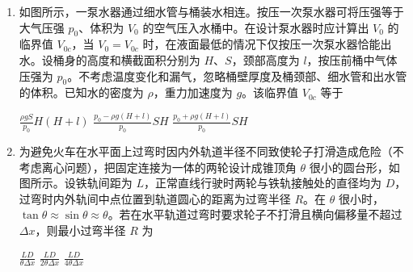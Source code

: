 \documentclass[\gkver]{gaokaozhenti}
\begin{document}
\begin{enumerate}
{故选 A。
}

\item
如图所示，一泵水器通过细水管与桶装水相连。按压一次泵水器可将压强等于大气压强 $p_{0}$、体积为 $V_{0}$ 的空气压入水桶中。在设计泵水器时应计算出 $V_{0}$ 的临界值 $V_{0c}$，当 $V_{0} = V_{0c}$ 时，在液面最低的情况下仅按压一次泵水器恰能出水。设桶身的高度和横截面积分别为 $H$、$S$，颈部高度为 $l$，按压前桶中气体压强为 $p_{0}$。不考虑温度变化和漏气，忽略桶壁厚度及桶颈部、细水管和出水管的体积。已知水的密度为 $\rho$，重力加速度为 $g$。该临界值 $V_{0c}$ 等于


{$\frac{\rho gS}{p_{0}}H(H + l)$}
{$\frac{p_{0} - \rho g(H + l)}{p_{0}}SH$}
{$\frac{p_{0} + \rho g(H + l)}{p_{0}}SH$}


\item
为避免火车在水平面上过弯时因内外轨道半径不同致使轮子打滑造成危险（不考虑离心问题），把固定连接为一体的两轮设计成锥顶角 $\theta$ 很小的圆台形，如图所示。设铁轨间距为 $L$，正常直线行驶时两轮与铁轨接触处的直径均为 $D$，过弯时内外轨间中点位置到轨道圆心的距离为过弯半径 $R$。在 $\theta$ 很小时，$\tan\theta \approx \sin\theta \approx \theta$。若在水平轨道过弯时要求轮子不打滑且横向偏移量不超过 $\Delta x$，则最小过弯半径 $R$ 为


{$\frac{LD}{\theta \Delta x}$}
{$\frac{LD}{2\theta \Delta x}$}
{$\frac{LD}{4\theta \Delta x}$}

\end{enumerate}
\end{document}
